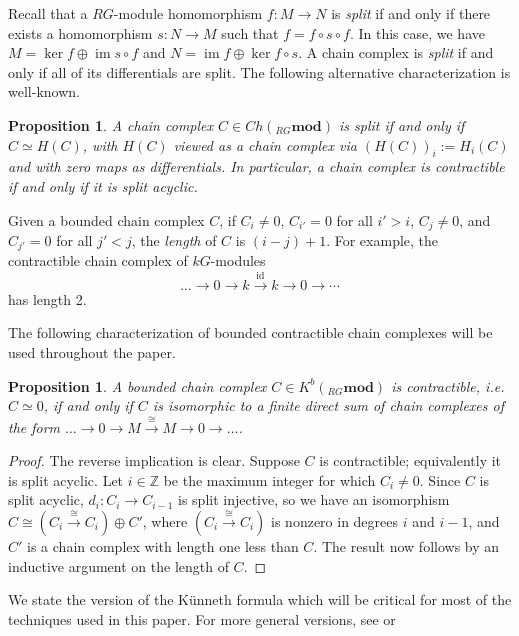 \documentclass[10pt,letterpaper, boxed, cm]{amsart}
\newcommand{\Z}{\mathbb{Z}}
\newcommand{\id}{\operatorname{id}}
\newcommand{\im}{\operatorname{im}}
\newtheorem{prop}[theorem]{Proposition}
\theoremstyle{remark}
\theoremstyle{definition}
\begin{document}
	Recall that a $RG$-module homomorphism $f: M \to N$ is \textit{split} if and only if there exists a homomorphism $s: N \to M$ such that $f = f \circ s \circ f$. In this case, we have $M = \ker f \oplus \im s\circ f$ and $N = \im f \oplus \ker f\circ s$. A chain complex is \textit{split} if and only if all of its differentials are split. The following alternative characterization is well-known.

	\begin{prop}{\cite[Propopsition 1.18.15]{L181}}
		A chain complex $C \in Ch({}_{RG}\mathbf{mod})$ is split if and only if $C\simeq H(C)$, with $H(C)$ viewed as a chain complex via $(H(C))_i := H_i(C)$ and with zero maps as differentials. In particular, a chain complex is contractible if and only if it is split acyclic.
	\end{prop}

	Given a bounded chain complex $C$, if $C_i \neq 0$, $C_{i'} = 0$ for all $i' > i$, $C_j \neq 0$, and $C_{j'} = 0$ for all $j' < j$, the \textit{length} of $C$ is $(i - j) + 1$. For example, the contractible chain complex of $kG$-modules \[\dots \to 0 \to k \xrightarrow{\id} k \to 0\to \cdots\] has length 2.

    The following characterization of bounded contractible chain complexes will be used throughout the paper.

    \begin{prop}
        A bounded chain complex $C \in K^b({}_{RG}\mathbf{mod})$ is contractible, i.e. $C \simeq 0$, if and only if $C$ is isomorphic to a finite direct sum of chain complexes of the form $\dots \to 0 \to M \xrightarrow{\cong} M \to 0\to \dots$.
    \end{prop}
    \begin{proof}
        The reverse implication is clear. Suppose $C$ is contractible; equivalently it is split acyclic. Let $i \in \Z$ be the maximum integer for which $C_i \neq 0$. Since $C$ is split acyclic, $d_i: C_i \to C_{i-1}$ is split injective, so we have an isomorphism $C \cong (C_i \xrightarrow{\cong} C_i) \oplus C'$, where $(C_i \xrightarrow{\cong} C_i)$ is nonzero in degrees $i$ and $i-1$, and $C'$ is a chain complex with length one less than $C$. The result now follows by an inductive argument on the length of $C$.
    \end{proof}

	We state the version of the K\"unneth formula which will be critical for most of the techniques used in this paper. For more general versions, see \cite[Theorem 3.6.3 and Theorem 5.6.4]{W94} or \cite[Theorem 2.21.7]{L181}
\end{document}
